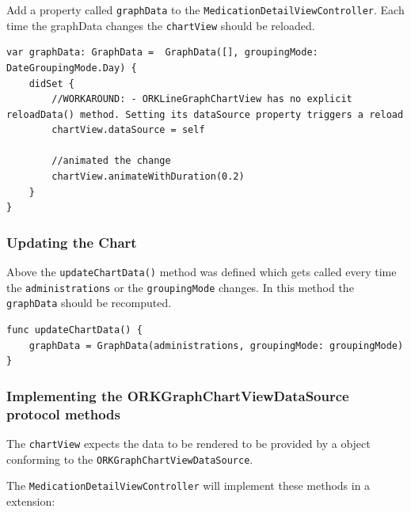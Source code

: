 \documentclass{article}
\begin{document}
Add a property called \texttt{graphData} to the
\texttt{MedicationDetailViewController}. Each time the graphData changes
the \texttt{chartView} should be reloaded.

\begin{verbatim}
var graphData: GraphData =  GraphData([], groupingMode: DateGroupingMode.Day) {
    didSet {
        //WORKAROUND: - ORKLineGraphChartView has no explicit reloadData() method. Setting its dataSource property triggers a reload
        chartView.dataSource = self

        //animated the change
        chartView.animateWithDuration(0.2)
    }
}
\end{verbatim}

\subsubsection{Updating the Chart}\label{implementing-the-updatechartdata-function}

Above the \texttt{updateChartData()} method was defined which gets
called every time the \texttt{administrations} or the
\texttt{groupingMode} changes. In this method the \texttt{graphData}
should be recomputed.

\begin{verbatim}
func updateChartData() {
    graphData = GraphData(administrations, groupingMode: groupingMode)
}
\end{verbatim}

\subsubsection{Implementing the ORKGraphChartViewDataSource protocol methods}\label{implementing-the-orkgraphchartviewdatasource-protocol-methods}

The \texttt{chartView} expects the data to be rendered to be provided by
a object conforming to the \texttt{ORKGraphChartViewDataSource}.

The \texttt{MedicationDetailViewController} will implement these methods
in a extension:
\end{document}
